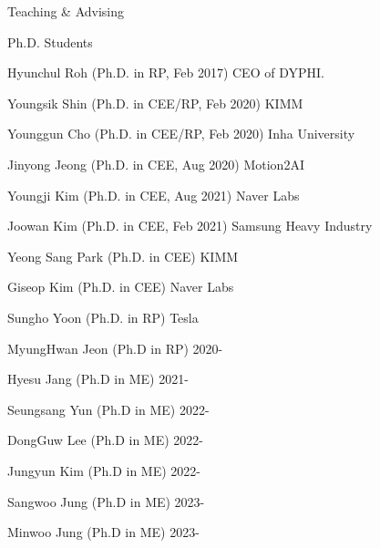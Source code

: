 \begin{rSection}{Teaching \& Advising}
\begin{rSubsection}{Ph.D. Students}{}{}{}
  \item Hyunchul Roh (Ph.D. in \acf{RP}, Feb 2017) \hfill CEO of DYPHI.
  \item Youngsik Shin (Ph.D. in \ac{CEE}/\ac{RP}, Feb 2020) \hfill KIMM
  \item Younggun Cho (Ph.D. in \ac{CEE}/\ac{RP}, Feb 2020) \hfill Inha University
  \item Jinyong Jeong (Ph.D. in \ac{CEE}, Aug 2020) \hfill Motion2AI
  \item Youngji Kim (Ph.D. in \ac{CEE}, Aug 2021) \hfill Naver Labs
  \item Joowan Kim (Ph.D. in \ac{CEE}, Feb 2021) \hfill Samsung Heavy Industry
  \item Yeong Sang Park (Ph.D. in \ac{CEE}) \hfill KIMM
  \item Giseop Kim (Ph.D. in \ac{CEE}) \hfill Naver Labs
  \item Sungho Yoon (Ph.D. in \ac{RP}) \hfill Tesla
  \item MyungHwan Jeon (Ph.D in \ac{RP}) \hfill 2020-
  \item Hyesu Jang (Ph.D in \ac{ME}) \hfill 2021-
  \item Seungsang Yun (Ph.D in \ac{ME}) \hfill 2022-
  \item DongGuw Lee (Ph.D in \ac{ME}) \hfill 2022-
  \item Jungyun Kim (Ph.D in \ac{ME}) \hfill 2022-
  \item Sangwoo Jung (Ph.D in \ac{ME}) \hfill 2023-
  \item Minwoo Jung (Ph.D in \ac{ME}) \hfill 2023-
\end{rSubsection}


\end{rSection}
